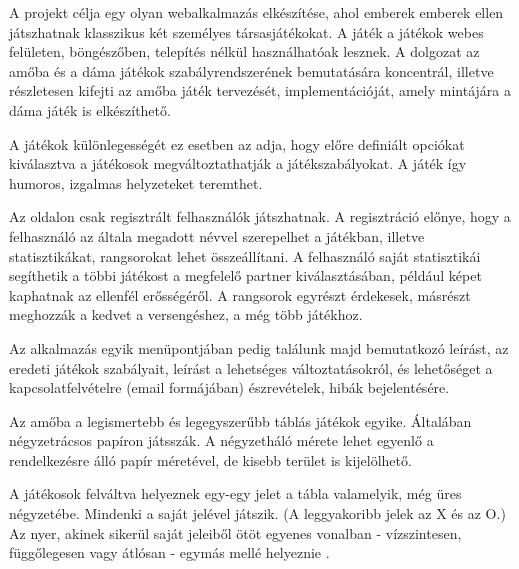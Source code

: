



A projekt célja egy olyan webalkalmazás elkészítése, ahol emberek emberek ellen játszhatnak klasszikus két személyes társasjátékokat. A játék a játékok webes felületen, böngészőben, telepítés nélkül használhatóak lesznek. A dolgozat az amőba és a dáma játékok szabályrendszerének bemutatására koncentrál, illetve részletesen kifejti az amőba játék tervezését, implementációját, amely mintájára a dáma játék is elkészíthető.

A játékok különlegességét ez esetben az adja, hogy előre definiált opciókat kiválasztva a játékosok megváltoztathatják a játékszabályokat. A játék így humoros, izgalmas helyzeteket teremthet.

Az oldalon csak regisztrált felhasználók játszhatnak. A regisztráció előnye, hogy a felhasználó az általa megadott névvel szerepelhet a játékban, illetve statisztikákat, rangsorokat lehet összeállítani. A felhasználó saját statisztikái segíthetik a többi játékost a megfelelő partner kiválasztásában, például képet kaphatnak az ellenfél erősségéről. A rangsorok egyrészt érdekesek, másrészt meghozzák a kedvet a versengéshez, a még több játékhoz.

Az alkalmazás egyik menüpontjában pedig találunk majd bemutatkozó leírást, az eredeti játékok szabályait, leírást a lehetséges változtatásokról, és lehetőséget a kapcsolatfelvételre (email formájában) észrevételek, hibák bejelentésére. 



Az amőba a legismertebb és legegyszerűbb táblás játékok egyike. Általában négyzetrácsos papíron játsszák. A négyzetháló mérete lehet egyenlő a rendelkezésre álló papír méretével, de kisebb terület is kijelölhető.

A játékosok felváltva helyeznek egy-egy jelet a tábla valamelyik, még üres négyzetébe. Mindenki a saját jelével játszik. (A leggyakoribb jelek az X és az O.) Az nyer, akinek sikerül saját jeleiből ötöt egyenes vonalban - vízszintesen, függőlegesen vagy átlósan - egymás mellé helyeznie \cite{fiveinarow-rules}.

